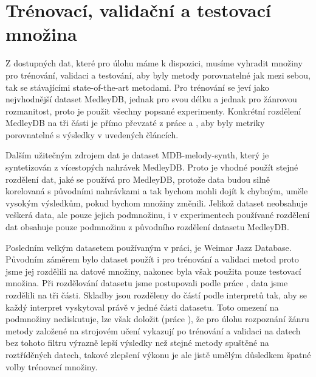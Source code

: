 \section{Trénovací, validační a testovací množina}

Z dostupných dat, které pro úlohu máme k dispozici, musíme vyhradit množiny pro trénování, validaci a testování, aby byly metody porovnatelné jak mezi sebou, tak se stávajícími state-of-the-art metodami. Pro trénování se jeví jako nejvhodnější dataset MedleyDB, jednak pro svou délku a jednak pro žánrovou rozmanitost, proto je použit všechny popsané experimenty. Konkrétní rozdělení MedleyDB na tři části je přímo převzaté z práce \cite{Bittner2017} a \cite{DBasaranSEssid2018}, aby byly metriky porovnatelné s výsledky v uvedených článcích. 


Dalším užitečným zdrojem dat je dataset MDB-melody-synth, který je syntetizován z vícestopých nahrávek MedleyDB. Proto je vhodné použít stejné rozdělení dat, jaké se používá pro MedleyDB, protože data budou silně korelovaná s původními nahrávkami a tak bychom mohli dojít k chybným, uměle vysokým výsledkům, pokud bychom množiny změnili. Jelikož dataset neobsahuje veškerá data, ale pouze jejich podmnožinu, i v experimentech používané rozdělení dat obsahuje pouze podmnožinu z původního rozdělení datasetu MedleyDB. 

Posledním velkým datasetem používaným v práci, je Weimar Jazz Database. Původním záměrem bylo dataset použít i pro trénování a validaci metod proto jsme jej rozdělili na datové množiny, nakonec byla však použita pouze testovací množina. Při rozdělování datasetu jsme postupovali podle práce \cite{Bittner2017}, data jsme rozdělili na tři části. Skladby jsou rozděleny do částí podle interpretů tak, aby se každý interpret vyskytoval právě v jedné části datasetu. Toto omezení na podmnožiny \cite{Bittner2017} nediskutuje, lze však doložit (práce \cite{Sturm2013}), že pro úlohu rozpoznání žánru metody založené na strojovém učení vykazují po trénování a validaci na datech bez tohoto filtru výrazně lepší výsledky než stejné metody spuštěné na roztříděných datech, takové zlepšení výkonu je ale jistě umělým důsledkem špatné volby trénovací množiny. 

